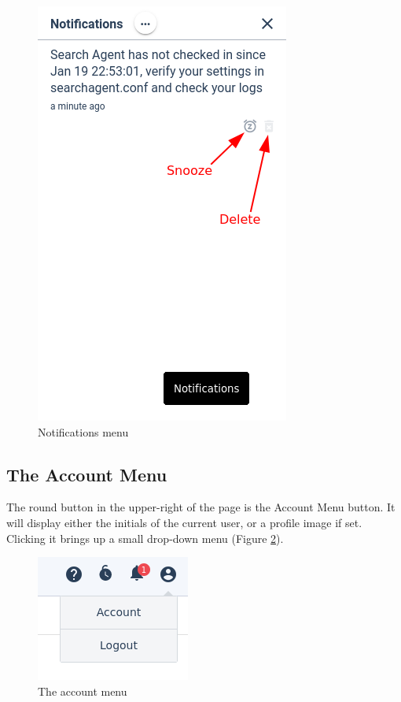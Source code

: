 \begin{figure}
	\includegraphics{images/notification-menu.png}
	\caption{Notifications menu}
	\label{fig:notification-menu}
\end{figure}

\subsection{The Account Menu}
\label{sec:account-menu}

The round button in the upper-right of the page is the Account Menu button. It will display either the initials of the current user, or a profile image if set. Clicking it brings up a small drop-down menu (Figure \ref{fig:accountmenu}).

\begin{figure}[H]
	\includegraphics{images/user-dropdown.png}
	\caption{The account menu}
	\label{fig:accountmenu}
\end{figure}


